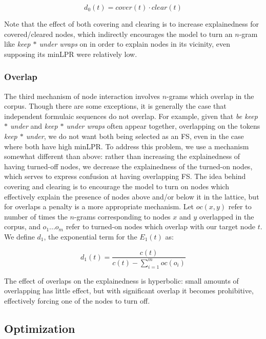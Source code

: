 \documentclass[11pt,letterpaper]{article}
\newcommand{\dotts}{...}
\newcommand{\gap}{$*$\xspace}
\newcommand{\ex}[1]{\textit{#1}\xspace}
\begin{document}
\begin{displaymath}
d_0(t) = cover(t) \cdot clear(t)
\end{displaymath}

Note that the effect of both covering and clearing is to  increase explainedness for covered/cleared nodes, which indirectly encourages the model to turn an $n$-gram like \ex{keep \gap under wraps} on in order to explain nodes in its vicinity, even supposing its minLPR were relatively low.

\subsubsection{Overlap}

The third mechanism of node interaction involves $n$-grams which overlap in the corpus. Though there are some exceptions, it is generally the case that independent formulaic sequences do not overlap. For example, given that \ex{be keep \gap under} and \ex{keep \gap under wraps} often appear together, overlapping on the tokens \ex{keep \gap under}, we do not want both being selected as an FS, even in the case where both have high minLPR. To address this problem, we use a mechanism somewhat different than above: rather than increasing the explainedness of having turned-off nodes, we decrease the explainedness of the turned-on nodes, which serves to express confusion at having overlapping FS. The idea behind covering and clearing is to encourage the model to turn on nodes which effectively explain the presence of nodes above and/or below it in the lattice, but for overlaps a penalty is a more appropriate mechanism. Let $oc(x,y)$ refer to number of times the $n$-grams corresponding to nodes $x$ and $y$ overlapped in the corpus, and $o_1\dotts o_m$ refer to turned-on nodes which overlap with our target node $t$. We define $d_1$, the exponential term for the $E_1(t)$ as:

\begin{displaymath}
d_{1}(t) = \frac{c(t)}{c(t) - \sum_{i=1}^{m}{oc(o_i)}}
\end{displaymath}

The effect of overlaps on the explainedness is hyperbolic: small amounts of overlapping has little effect, but with significant overlap it becomes prohibitive, effectively forcing one of the nodes to turn off. 

 
\subsection{Optimization}
\end{document}
